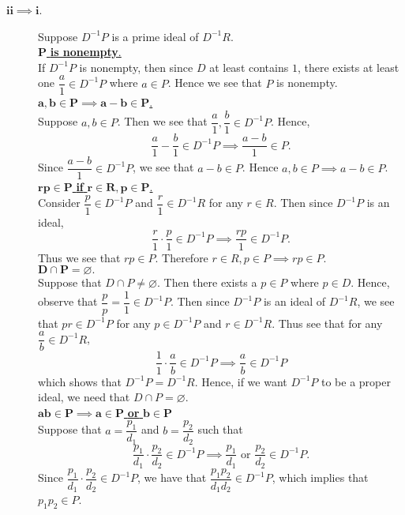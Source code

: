 \documentclass[12pt,letterpaper]{algebra_book}
\theoremstyle{definition}
\begin{document}
\begin{prf}
\begin{description}
        \item[$\bm{ii \implies i}$.] 
        Suppose $D^{-1}P$ is a prime ideal of $D^{-1}R$. 
        \\[1.2ex]
        \underline{$\bm{P}$ \textbf{is nonempty}.}\\[1.2ex]
        If $D^{-1}P$ is nonempty, then since $D$ at least contains $1$, there exists at least one
        $\dfrac{a}{1} \in D^{-1}P$ where $a \in P$.
        Hence we see that $P$ is nonempty.
        \\[1.2ex]
        \underline{$\bm{a,b \in P \implies a - b \in P}$.}\\[1.2ex]
        Suppose $a, b \in P$. Then we see that 
        $\dfrac{a}{1}, \dfrac{b}{1} \in D^{-1}P$. Hence,
        \[
            \frac{a}{1} - \frac{b}{1} \in D^{-1}P \implies 
            \frac{a - b}{1} \in P.
        \]
        Since $\dfrac{a - b}{1} \in D^{-1}P$, we see that $a - b \in
        P$. Hence $a, b \in P \implies a - b \in P$.
        \\[1.2ex]
        \underline{$\bm{rp \in P}$ \textbf{if} $\bm{r \in R, p \in P}$.}\\[1.2ex]
        Consider $\dfrac{p}{1} \in D^{-1}P$ and $\dfrac{r}{1} \in
        D^{-1}R$ for any $r \in R$. Then since $D^{-1}P$ is an ideal,
        \[
            \frac{r}{1} \cdot \frac{p}{1} \in D^{-1}P \implies \frac{rp}{1} \in D^{-1}P.
        \]
        Thus we see that $rp \in P$. Therefore $r \in R, p \in P
        \implies rp \in P$. 
        \\[1.2ex]
        \underline{$\bm{D \cap P = \varnothing}.$}\\[1.2ex]
        Suppose that $D \cap P \ne \varnothing$. Then there exists a
        $p \in P$ where $p \in D$. Hence, observe that $\dfrac{p}{p} =
        \dfrac{1}{1} \in D^{-1}P$. Then since $D^{-1}P$ is an ideal of
        $D^{-1}R$, we see that
        $pr \in D^{-1}P$ for any $p \in D^{-1}P$ and $r \in D^{-1}R$. Thus
        see that for any $\dfrac{a}{b} \in D^{-1}R$, 
        \[
            \frac{1}{1} \cdot \frac{a}{b} \in D^{-1}P \implies \frac{a}{b} \in D^{-1}P
        \]
        which shows that $D^{-1}P = D^{-1}R$. Hence, if we want
        $D^{-1}P$ to be a proper ideal, we need that $D \cap P = \varnothing.$
        \\[1.2ex]
        \underline{$\bm{ab \in P \implies a \in P}$ \textbf{or} $\bm{b\in P}$}\\[1.2ex]
        Suppose that $a = \dfrac{p_1}{d_1}$ and $b =
        \dfrac{p_2}{d_2}$ such that 
        \[
            \frac{p_1}{d_1}\cdot \frac{p_2}{d_2} \in D^{-1}P \implies \frac{p_1}{d_1} \text{ or } \frac{p_2}{d_2} \in D^{-1}P.
        \]
        Since $\dfrac{p_1}{d_1}\cdot \dfrac{p_2}{d_2} \in D^{-1}P$, we
        have that $\dfrac{p_1p_2}{d_1d_2} \in D^{-1}P$, which implies
        that $p_1p_2 \in P$. 


\end{description}
\end{prf}
\end{document}
